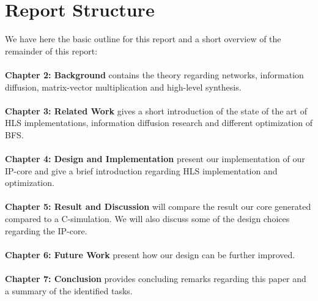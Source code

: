 \section{Report Structure}
We have here the basic outline for this report and a short overview of the remainder of this report:\\ \hfill \\ \hfill
\textbf{Chapter 2: Background} contains the theory regarding networks, information diffusion, matrix-vector multiplication and high-level synthesis. \\ \hfil \\ \hfil
\textbf{Chapter 3: Related Work} gives a short introduction of the state of the art of HLS implementations, information diffusion research and different optimization of BFS.\\ \hfil \\ \hfil
\textbf{Chapter 4: Design and Implementation} present our implementation of our IP-core and give a brief introduction regarding HLS implementation and optimization.  \\ \hfil \\ \hfil
\textbf{Chapter 5: Result and Discussion} will compare the result our core generated compared to a C-simulation. We will also discuss some of the design choices regarding the IP-core. \\ \hfil \\ \hfil
\textbf{Chapter 6: Future Work} present how our design can be further improved. \\ \hfil \\ \hfil
\textbf{Chapter 7: Conclusion} provides concluding remarks regarding this paper and a summary of the identified tasks. \\ \hfil \\ \hfil
